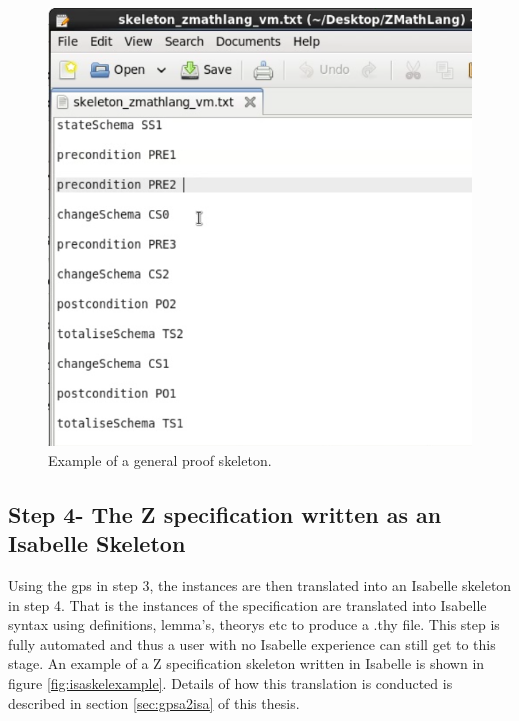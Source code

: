 \begin{figure}[H]
 \begin{center}
 \includegraphics [scale=0.2]{Figures/Design/proofskel.png}
 \caption{Example of a general proof skeleton.}
 \label{fig:proofskelexample}
\end{center}
\end{figure} 

\subsection{Step 4- The Z specification written as an Isabelle Skeleton}

Using the \gls{gps} in step 3, the instances are then translated into an Isabelle skeleton in step 4. That is the instances of the specification are translated into Isabelle syntax using definitions, lemma's, theorys etc to produce a .thy file. This step is fully automated and thus a user with no Isabelle experience can still get to this stage. An example of a Z specification skeleton written in Isabelle is shown in figure \ref{fig:isaskelexample}. Details of how this translation is conducted is described in section \ref{sec:gpsa2isa} of this thesis.

